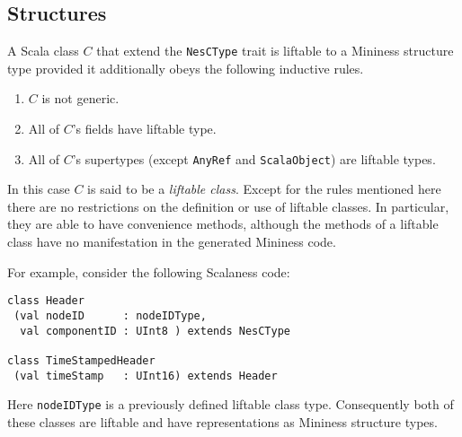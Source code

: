 \subsection{Structures}

A Scala class $C$ that extend the \texttt{NesCType} trait is liftable to a Mininess structure
type provided it additionally obeys the following inductive rules.

\begin{enumerate}
\item $C$ is not generic.
\item All of $C$'s fields have liftable type.
\item All of $C$'s supertypes (except \texttt{AnyRef} and \texttt{ScalaObject}) are liftable
  types.
\end{enumerate}

In this case $C$ is said to be a \textit{liftable class}. Except for the rules mentioned here
there are no restrictions on the definition or use of liftable classes. In particular, they are
able to have convenience methods, although the methods of a liftable class have no manifestation
in the generated Mininess code.

For example, consider the following Scalaness code:

\singlespace
\begin{Verbatim}
class Header
 (val nodeID      : nodeIDType,
  val componentID : UInt8 ) extends NesCType

class TimeStampedHeader
 (val timeStamp   : UInt16) extends Header
\end{Verbatim}
\primaryspacing

Here \texttt{nodeIDType} is a previously defined liftable class type. Consequently both of these
classes are liftable and have representations as Mininess structure types. 

